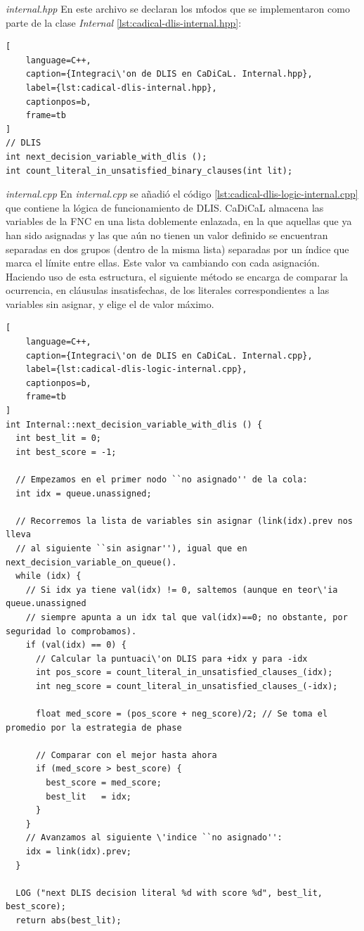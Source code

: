 {\textit{internal.hpp}}
En este archivo se declaran los m\'todos que se implementaron como parte de la clase \textit{Internal} \ref{lst:cadical-dlis-internal.hpp}:

\begin{lstlisting}[
    language=C++,
    caption={Integraci\'on de DLIS en CaDiCaL. Internal.hpp},
    label={lst:cadical-dlis-internal.hpp},
    captionpos=b,
    frame=tb
]
// DLIS
int next_decision_variable_with_dlis ();
int count_literal_in_unsatisfied_binary_clauses(int lit);

\end{lstlisting}

{\textit{internal.cpp}}
En \textit{internal.cpp} se a\~nadi\'o el c\'odigo \ref{lst:cadical-dlis-logic-internal.cpp} que contiene la l\'ogica de funcionamiento de DLIS.
CaDiCaL almacena las variables de la FNC en una lista doblemente enlazada, en la que aquellas que ya han sido asignadas y las que a\'un no tienen un valor definido se encuentran separadas en dos grupos (dentro de la misma lista) separadas por un \'indice que marca el l\'imite entre ellas. Este valor va cambiando con cada asignaci\'on. Haciendo uso de esta estructura, el siguiente m\'etodo se encarga de comparar la ocurrencia, en cl\'ausulas insatisfechas, de los literales correspondientes a las variables sin asignar, y elige el de valor m\'aximo.

\begin{lstlisting}[
    language=C++,
    caption={Integraci\'on de DLIS en CaDiCaL. Internal.cpp},
    label={lst:cadical-dlis-logic-internal.cpp},
    captionpos=b,
    frame=tb
]
int Internal::next_decision_variable_with_dlis () {
  int best_lit = 0;
  int best_score = -1;

  // Empezamos en el primer nodo ``no asignado'' de la cola:
  int idx = queue.unassigned;

  // Recorremos la lista de variables sin asignar (link(idx).prev nos lleva
  // al siguiente ``sin asignar''), igual que en next_decision_variable_on_queue().
  while (idx) {
    // Si idx ya tiene val(idx) != 0, saltemos (aunque en teor\'ia queue.unassigned
    // siempre apunta a un idx tal que val(idx)==0; no obstante, por seguridad lo comprobamos).
    if (val(idx) == 0) {
      // Calcular la puntuaci\'on DLIS para +idx y para -idx
      int pos_score = count_literal_in_unsatisfied_clauses_(idx);
      int neg_score = count_literal_in_unsatisfied_clauses_(-idx);

      float med_score = (pos_score + neg_score)/2; // Se toma el promedio por la estrategia de phase

      // Comparar con el mejor hasta ahora
      if (med_score > best_score) {
        best_score = med_score;
        best_lit   = idx;    
      }      
    }
    // Avanzamos al siguiente \'indice ``no asignado'':
    idx = link(idx).prev;
  }

  LOG ("next DLIS decision literal %d with score %d", best_lit, best_score);
  return abs(best_lit);

\end{lstlisting}

